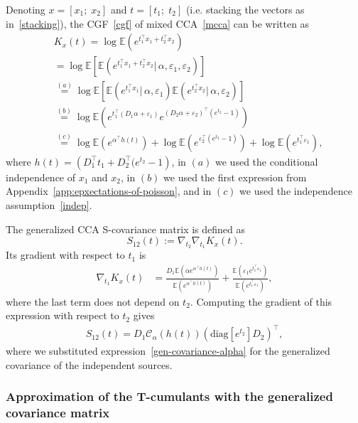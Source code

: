 \documentclass{article}
\newcommand{\Rra}[1]{\left(#1\right)}
\newcommand{\sbra}[1]{\left[#1\right]}
\newcommand{\diag}{\mathrm{diag}}
\newcommand{\ebb}{\mathbb{E}}
\newcommand{\ccal}{\mathcal{C}}
\begin{document}
Denoting $x=[x_1;\;x_2]$ and $t=[t_1;\;t_2]$ (i.e. stacking the vectors as in~\eqref{stacking}), the CGF~\eqref{cgf} of mixed CCA~\eqref{mcca} can be written as
$$
\begin{aligned}
&K_x(t)  = \log \ebb ({ e^{t_1^{\top} x_1 + t_2^{\top} x_2 } }) \\
&= \log \ebb\sbra{ \ebb({e^{t_1^{\top} x_1 + t_2^{\top} x_2} |\, \alpha, \varepsilon_1, \varepsilon_2}) }\\
& \stackrel{(a)}{=} \log \ebb\sbra{ \ebb({e^{t_1^{\top}x_1} |\, \alpha, \varepsilon_1}) \ebb({e^{t_2^{\top}x_2}|\,\alpha,\varepsilon_2}) } \\
& \stackrel{(b)}{=} \log \ebb\Rra{ e^{t_1^{\top}(D_1\alpha + \varepsilon_1)}e^{(D_2\alpha + \varepsilon_2)^{\top}(e^{t_2}-1)} } \\
& \stackrel{(c)}{=} \log\ebb\Rra{ e^{\alpha^{\top} h(t)} }  
 + \log \ebb \Rra{ e^{\varepsilon_2^{\top}(e^{t_2}-1)} } + \log\ebb ({ e^{t_1^{\top} \varepsilon_1 } }),
\end{aligned}
$$
where $h(t)=({D_1^{\top}t_1 + D_2^{\top}(e^{t_2} - 1})$, in $(a)$ we used the conditional independence of $x_1$ and $x_2$, in $(b)$ we used the first expression from Appendix~\ref{app:epxectations-of-poisson}, and in $(c)$ we used the independence assumption~\eqref{indep}.

The generalized CCA S-covariance matrix is defined as 
$$
S_{12}(t) := \nabla_{t_2} \nabla_{t_1} K_x(t).
$$ 
Its gradient with respect to $t_1$ is
$$
\begin{aligned}
\nabla_{t_1} K_x(t) & = \frac{ D_1\ebb ({\alpha e^{\alpha^{\top} h(t) } }) }{ \ebb ({ e^{\alpha^{\top} h(t) } }) } 
+ \frac{ \ebb ({ \varepsilon_1 e^{t_1^{\top} \varepsilon_1 } }) }{ \ebb ({ e^{t_1^{\top} \varepsilon_1 } }) },
\end{aligned}
$$
where the last term does not depend on $t_2$. Computing the gradient of this expression with respect to $t_2$ gives
$$
\begin{aligned}
S_{12}(t) = D_1 \ccal_{\alpha} ({ h(t) }) \Rra{ \diag [{ e^{t_2} }] D_2 }^{\top},
\end{aligned}
$$
where we substituted expression~\eqref{gen-covariance-alpha} for the generalized covariance of the independent sources.

\subsubsection{Approximation of the T-cumulants with the generalized covariance matrix}
\label{app:dir-derivative-approx}
\end{document}
